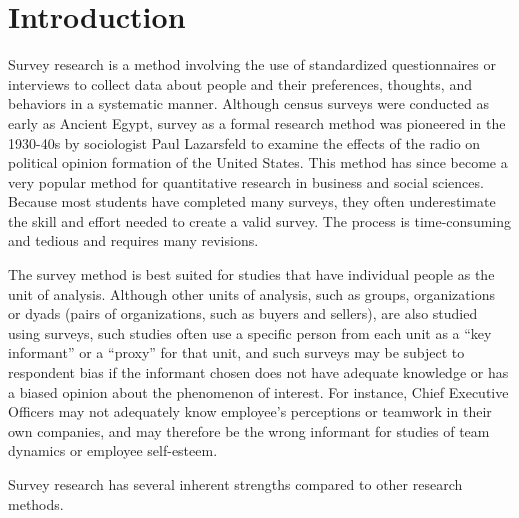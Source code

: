 \section{Introduction}

Survey research is a method involving the use of standardized questionnaires or interviews to collect data about people and their preferences, thoughts, and behaviors in a systematic manner. Although census surveys were conducted as early as Ancient Egypt, survey as a formal research method was pioneered in the 1930-40s by sociologist Paul Lazarsfeld to examine the effects of the radio on political opinion formation of the United States. This method has since become a very popular method for quantitative research in business and social sciences. Because most students have completed many surveys, they often underestimate the skill and effort needed to create a valid survey. The process is time-consuming and tedious and requires many revisions.

The survey method is best suited for studies that have individual people as the unit of analysis. Although other units of analysis, such as groups, organizations or dyads (pairs of organizations, such as buyers and sellers), are also studied using surveys, such studies often use a specific person from each unit as a ``key informant'' or a ``proxy'' for that unit, and such surveys may be subject to respondent bias if the informant chosen does not have adequate knowledge or has a biased opinion about the phenomenon of interest. For instance, Chief Executive Officers may not adequately know employee's perceptions or teamwork in their own companies, and may therefore be the wrong informant for studies of team dynamics or employee self-esteem.

Survey research has several inherent strengths compared to other research methods. 

